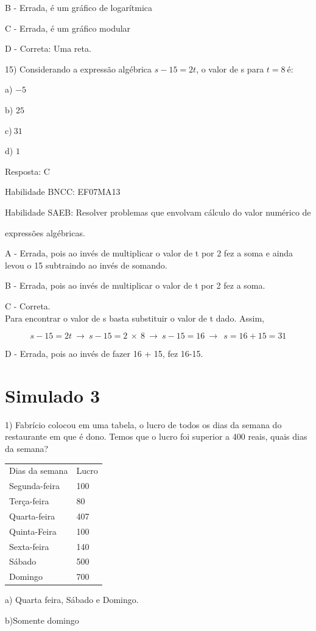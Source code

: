 {{{{{{{{{{{{{{{B - Errada, é um gráfico de logarítmica

C - Errada, é um gráfico modular

D - Correta: Uma reta.

15) Considerando a expressão algébrica \(s - 15 = 2t\), o valor de s
para \(t = 8\ \)é:

a) \(- 5\)

b) \(25\)

c)\(\ 31\)

d) \(1\)

Resposta: C

Habilidade BNCC: EF07MA13

Habilidade SAEB: Resolver problemas que envolvam cálculo do valor
numérico de

expressões algébricas.

A - Errada, pois ao invés de multiplicar o valor de t por 2 fez a soma e
ainda levou o 15 subtraindo ao invés de somando.

B - Errada, pois ao invés de multiplicar o valor de t por 2 fez a soma.

C - Correta.\\
Para encontrar o valor de s basta substituir o valor de t dado. Assim,

\[s - 15 = 2t\  \rightarrow \ s - 15 = 2\  \times \ 8\  \rightarrow \ s - 15 = 16\  \rightarrow \ \ s = 16 + 15 = 31\]

D - Errada, pois ao invés de fazer 16 + 15, fez 16-15.

\hypertarget{simulado-3}{%
\section{Simulado 3}

1) Fabrício colocou em uma tabela, o lucro de todos os dias da semana do
restaurante em que é dono. Temos que o lucro foi superior a 400 reais,
quais dias da semana?

\begin{longtable}[]{@{}ll@{}}
\toprule
\endhead
Dias da semana & Lucro\tabularnewline
Segunda-feira & 100\tabularnewline
Terça-feira & 80\tabularnewline
Quarta-feira & 407\tabularnewline
Quinta-Feira & 100\tabularnewline
Sexta-feira & 140\tabularnewline
Sábado & 500\tabularnewline
Domingo & 700\tabularnewline
\bottomrule
\end{longtable}

a) Quarta feira, Sábado e Domingo.

b)Somente domingo

}}}}}}}}}}}}}}}}
